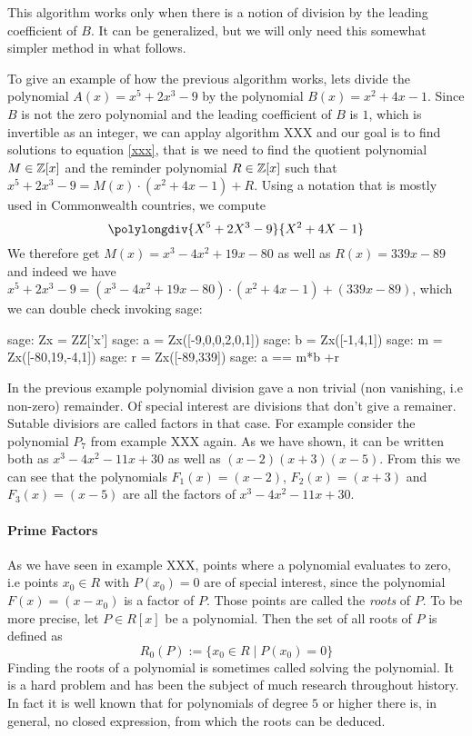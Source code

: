 This algorithm works only when there is a notion of division by the leading coefficient of $B$. It can be generalized, but we will only need this somewhat simpler method in what follows.
\begin{example} To give an example of how the previous algorithm works, lets divide the polynomial $A(x)=x^5+2x^3-9$ by the polynomial $B(x)=x^2+4x-1$. Since $B$ is not the zero polynomial and the leading coefficient of $B$ is $1$, which is invertible as an integer, we can applay algorithm XXX and our goal is to find solutions to equation \ref{xxx}, that is we need to find the quotient polynomial $M\in\mathbb{Z}[x]$ and the reminder polynomial $R \in \mathbb{Z}[x]$ such that $x^5+2x^3-9 = M(x)\cdot (x^2+4x-1) + R$. Using a notation that is mostly used in Commonwealth countries, we compute
\begin{equation}
\polylongdiv{X^5+2X^3-9}{X^2+4X-1}
\end{equation}
We therefore get $M(x)=x^3-4x^2+19x-80$ as well as $R(x)=339x-89$ and indeed we have $x^5+2x^3-9 = (x^3-4x^2+19x-80)\cdot (x^2+4x-1) + (339x-89)$, which we can double check invoking sage:
\begin{sagecommandline}
sage: Zx = ZZ['x']
sage: a = Zx([-9,0,0,2,0,1])
sage: b = Zx([-1,4,1])
sage: m = Zx([-80,19,-4,1])
sage: r = Zx([-89,339])
sage: a == m*b +r
\end{sagecommandline}
\end{example}
\begin{example} In the previous example polynomial division gave a non trivial (non vanishing, i.e non-zero) remainder. Of special interest are divisions that don't give a remainer. Sutable divisiors are called factors in that case. For example consider the polynomial $P_7$ from example XXX again. As we have shown, it can be written both as $x^3 - 4 x^2 - 11 x + 30$ as well as $(x-2)(x + 3)(x-5)$. From this we can see that the polynomials $F_1(x)=(x-2)$, $F_2(x)=(x+3)$ and $F_3(x)=(x-5)$ are all the factors of $x^3 - 4 x^2 - 11 x + 30$.
\end{example}

\paragraph{Prime Factors}
As we have seen in example XXX, points where a polynomial evaluates to zero, i.e points $x_0\in R$ with $P(x_0)=0$ are of special interest, since the polynomial $F(x)=(x-x_0)$ is a factor of $P$. Those points are called the \textit{roots} of $P$. To be more precise, let $P\in R[x]$ be a polynomial. Then the set of all roots of $P$ is defined as
\begin{equation}
R_0(P):=\{x_0\in R\;|\; P(x_0)=0\}
\end{equation}
Finding the roots of a polynomial is sometimes called solving the polynomial. It is a hard problem and has been the subject of much research throughout history. In fact it is well known that for polynomials of degree $5$ or higher there is, in general, no closed expression, from which the roots can be deduced. 

